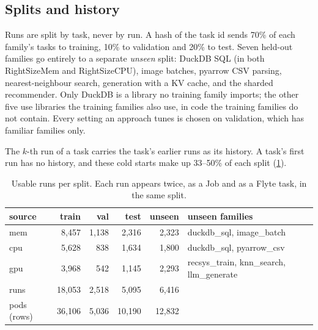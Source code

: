 \subsection{Splits and history}
Runs are split by task, never by run. A hash of the task id sends 70\% of each family's tasks to training, 10\% to
validation and 20\% to test. Seven held-out families go entirely to a separate \emph{unseen} split: DuckDB SQL
(in both RightSizeMem and RightSizeCPU), image batches, pyarrow CSV parsing, nearest-neighbour search, generation
with a KV cache, and the sharded recommender. Only DuckDB is a library no training family imports; the other five
use libraries the training families also use, in code the training families do not contain. Every setting an
approach tunes is chosen on validation, which has familiar families only.

The $k$-th run of a task carries the task's earlier runs as its history. A task's first run has no history, and
these cold starts make up 33--50\% of each split (\cref{tab:splits}).

\begin{table}[tbp]
\centering\small
\caption{Usable runs per split. Each run appears twice, as a Job and as a Flyte task, in the same split.}
\label{tab:splits}
\begin{tabular}{@{}lrrrrl@{}}
\toprule
source & train & val & test & unseen & unseen families \\
\midrule
mem & 8,457 & 1,138 & 2,316 & 2,323 & duckdb\_sql, image\_batch \\
cpu & 5,628 &   838 & 1,634 & 1,800 & duckdb\_sql, pyarrow\_csv \\
gpu & 3,968 &   542 & 1,145 & 2,293 & recsys\_train, knn\_search, llm\_generate \\
\midrule
runs        & 18,053 & 2,518 &  5,095 &  6,416 & \\
pods (rows) & 36,106 & 5,036 & 10,190 & 12,832 & \\
\bottomrule
\end{tabular}
\end{table}
